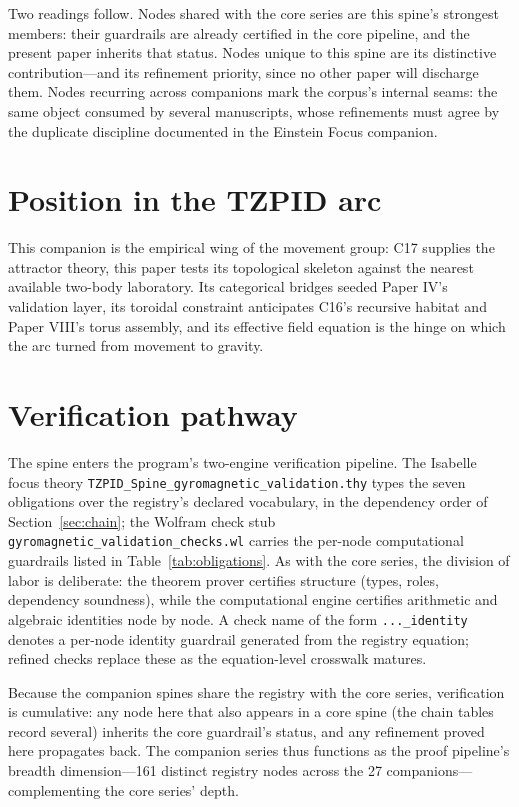 \documentclass[11pt]{article}
\theoremstyle{remark}
\begin{document}
Two readings follow. Nodes shared with the core series are this spine's strongest members: their guardrails are already certified in the core pipeline, and the present paper inherits that status. Nodes unique to this spine are its distinctive contribution---and its refinement priority, since no other paper will discharge them. Nodes recurring across companions mark the corpus's internal seams: the same object consumed by several manuscripts, whose refinements must agree by the duplicate discipline documented in the Einstein Focus companion.

\section{Position in the TZPID arc}
\label{sec:arc}

This companion is the empirical wing of the movement group: C17 supplies the attractor theory, this paper tests its topological skeleton against the nearest available two-body laboratory. Its categorical bridges seeded Paper IV's validation layer, its toroidal constraint anticipates C16's recursive habitat and Paper VIII's torus assembly, and its effective field equation is the hinge on which the arc turned from movement to gravity.

\section{Verification pathway}
\label{sec:verify}

The spine enters the program's two-engine verification pipeline. The Isabelle focus theory \texttt{TZPID\_Spine\_gyromagnetic\_validation.thy} types the seven obligations over the registry's declared vocabulary, in the dependency order of Section~\ref{sec:chain}; the Wolfram check stub \texttt{gyromagnetic\_validation\_checks.wl} carries the per-node computational guardrails listed in Table~\ref{tab:obligations}. As with the core series, the division of labor is deliberate: the theorem prover certifies structure (types, roles, dependency soundness), while the computational engine certifies arithmetic and algebraic identities node by node. A check name of the form \texttt{...\_identity} denotes a per-node identity guardrail generated from the registry equation; refined checks replace these as the equation-level crosswalk matures.

Because the companion spines share the registry with the core series, verification is cumulative: any node here that also appears in a core spine (the chain tables record several) inherits the core guardrail's status, and any refinement proved here propagates back. The companion series thus functions as the proof pipeline's breadth dimension---161 distinct registry nodes across the 27 companions---complementing the core series' depth.
\end{document}
